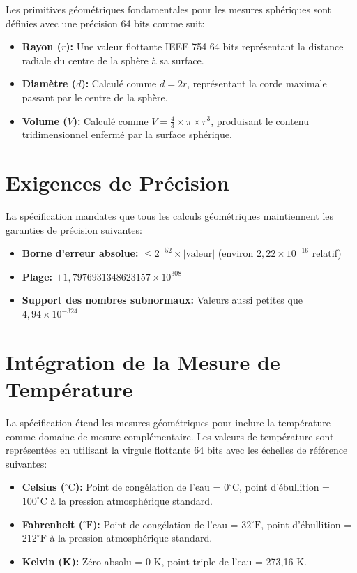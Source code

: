 \documentclass[12pt]{book}
\begin{document}
Les primitives géométriques fondamentales pour les mesures sphériques sont définies avec une précision 64 bits comme suit:

\begin{itemize}
\item \textbf{Rayon ($r$):} Une valeur flottante IEEE 754 64 bits représentant la distance radiale du centre de la sphère à sa surface.
\item \textbf{Diamètre ($d$):} Calculé comme $d = 2r$, représentant la corde maximale passant par le centre de la sphère.
\item \textbf{Volume ($V$):} Calculé comme $V = \frac{4}{3} \times \pi \times r^3$, produisant le contenu tridimensionnel enfermé par la surface sphérique.
\end{itemize}

\section{Exigences de Précision}

La spécification mandates que tous les calculs géométriques maintiennent les garanties de précision suivantes:

\begin{itemize}
\item \textbf{Borne d'erreur absolue:} $\leq 2^{-52} \times |\text{valeur}|$ (environ $2,22 \times 10^{-16}$ relatif)
\item \textbf{Plage:} $\pm 1,7976931348623157 \times 10^{308}$
\item \textbf{Support des nombres subnormaux:} Valeurs aussi petites que $4,94 \times 10^{-324}$
\end{itemize}

\section{Intégration de la Mesure de Température}

La spécification étend les mesures géométriques pour inclure la température comme domaine de mesure complémentaire. Les valeurs de température sont représentées en utilisant la virgule flottante 64 bits avec les échelles de référence suivantes:

\begin{itemize}
\item \textbf{Celsius ($^{\circ}\text{C}$):} Point de congélation de l'eau = $0^{\circ}\text{C}$, point d'ébullition = $100^{\circ}\text{C}$ à la pression atmosphérique standard.
\item \textbf{Fahrenheit ($^{\circ}\text{F}$):} Point de congélation de l'eau = $32^{\circ}\text{F}$, point d'ébullition = $212^{\circ}\text{F}$ à la pression atmosphérique standard.
\item \textbf{Kelvin (K):} Zéro absolu = 0 K, point triple de l'eau = 273,16 K.
\end{itemize}
\end{document}
